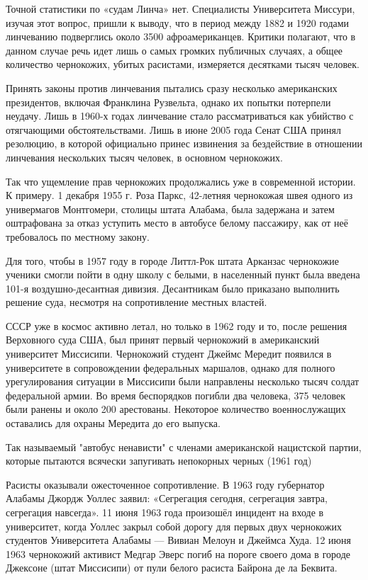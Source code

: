 Точной статистики по «судам Линча» нет. Специалисты Университета Миссури,
изучая этот вопрос, пришли к выводу, что в период между 1882 и 1920 годами
линчеванию подверглись около 3500 афроамериканцев. Критики полагают, что в
данном случае речь идет лишь о самых громких публичных случаях, а общее
количество чернокожих, убитых расистами, измеряется десятками тысяч человек.

Принять законы против линчевания пытались сразу несколько американских
президентов, включая Франклина Рузвельта, однако их попытки потерпели неудачу.
Лишь в 1960-х годах линчевание стало рассматриваться как убийство с отягчающими
обстоятельствами. Лишь в июне 2005 года Сенат США принял резолюцию, в которой
официально принес извинения за бездействие в отношении линчевания нескольких
тысяч человек, в основном чернокожих.

Так что ущемление прав чернокожих продолжались уже в современной истории. К
примеру. 1 декабря 1955 г. Роза Паркс, 42-летняя чернокожая швея одного из
универмагов Монтгомери, столицы штата Алабама, была задержана и затем
оштрафована за отказ уступить место в автобусе белому пассажиру, как от неё
требовалось по местному закону.

Для того, чтобы в 1957 году в городе Литтл-Рок штата Арканзас чернокожие
ученики смогли пойти в одну школу с белыми, в населенный пункт была введена
101-я воздушно-десантная дивизия. Десантникам было приказано выполнить решение
суда, несмотря на сопротивление местных властей.

СССР уже в космос активно летал, но только в 1962 году и то, после решения
Верховного суда США, был принят первый чернокожий в американский университет
Миссисипи. Чернокожий студент Джеймс Мередит появился в университете в
сопровождении федеральных маршалов, однако для полного урегулирования ситуации
в Миссисипи были направлены несколько тысяч солдат федеральной армии. Во время
беспорядков погибли два человека, 375 человек были ранены и около 200
арестованы. Некоторое количество военнослужащих оставались для охраны Мередита
до его выпуска.

Так называемый "автобус ненависти" с членами американской нацистской партии,
которые пытаются всячески запугивать непокорных черных (1961 год)

Расисты оказывали ожесточенное сопротивление. В 1963 году губернатор Алабамы
Джордж Уоллес заявил: «Сегрегация сегодня, сегрегация завтра, сегрегация
навсегда». 11 июня 1963 года произошёл инцидент на входе в университет, когда
Уоллес закрыл собой дорогу для первых двух чернокожих студентов Университета
Алабамы --- Вивиан Мелоун и Джеймса Худа. 12 июня 1963 чернокожий активист Медгар
Эверс погиб на пороге своего дома в городе Джексоне (штат Миссисипи) от пули
белого расиста Байрона де ла Беквита.

